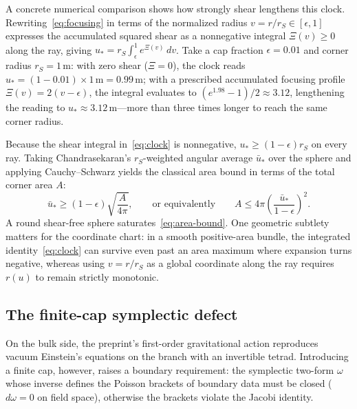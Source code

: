 \documentclass[10pt,a4paper]{article}
\begin{document}
A concrete numerical comparison shows how strongly shear lengthens this clock. Rewriting~\eqref{eq:focusing} in terms of the normalized radius $v = r/r_S \in [\epsilon, 1]$ expresses the accumulated squared shear as a nonnegative integral $\Xi(v) \ge 0$ along the ray, giving $u_* = r_S \int_\epsilon^1 e^{\Xi(v)}\,dv$. Take a cap fraction $\epsilon = 0.01$ and corner radius $r_S = 1\,\mathrm{m}$: with zero shear ($\Xi = 0$), the clock reads $u_* = (1 - 0.01)\times 1\,\mathrm{m} = 0.99\,\mathrm{m}$; with a prescribed accumulated focusing profile $\Xi(v) = 2(v - \epsilon)$, the integral evaluates to $(e^{1.98}-1)/2 \approx 3.12$, lengthening the reading to $u_* \approx 3.12\,\mathrm{m}$---more than three times longer to reach the same corner radius.

Because the shear integral in~\eqref{eq:clock} is nonnegative, $u_* \ge (1-\epsilon)r_S$ on every ray. Taking Chandrasekaran's $r_S$-weighted angular average $\bar u_*$ over the sphere and applying Cauchy--Schwarz yields the classical area bound in terms of the total corner area $A$:
\begin{equation}
  \bar u_* \ge (1 - \epsilon)\sqrt{\frac{A}{4\pi}},
  \qquad\text{or equivalently}\qquad
  A \le 4\pi\left(\frac{\bar u_*}{1-\epsilon}\right)^2.
  \label{eq:area-bound}
\end{equation}
A round shear-free sphere saturates~\eqref{eq:area-bound}. One geometric subtlety matters for the coordinate chart: in a smooth positive-area bundle, the integrated identity~\eqref{eq:clock} can survive even past an area maximum where expansion turns negative, whereas using $v = r/r_S$ as a global coordinate along the ray requires $r(u)$ to remain strictly monotonic.

\subsection{The finite-cap symplectic defect}
\label{subsec:cap-defect}
On the bulk side, the preprint's first-order gravitational action reproduces vacuum Einstein's equations on the branch with an invertible tetrad. Introducing a finite cap, however, raises a boundary requirement: the symplectic two-form $\omega$ whose inverse defines the Poisson brackets of boundary data must be closed ($d\omega = 0$ on field space), otherwise the brackets violate the Jacobi identity.
\end{document}
